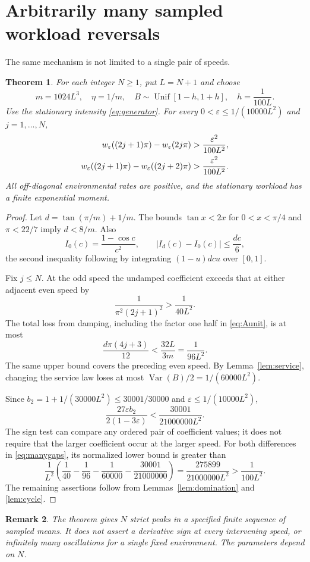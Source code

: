 \documentclass[10pt,a4paper]{amsart}
\numberwithin{equation}{section}
\newtheorem{theorem}{Theorem}[section]
\newtheorem{remark}[theorem]{Remark}
\newcommand{\1}{\mathbf 1}
\newcommand{\eps}{\varepsilon}
\DeclareMathOperator{\Var}{Var}
\DeclareMathOperator{\Unif}{Unif}
\begin{document}
\section{Arbitrarily many sampled workload reversals}\label{sec:many}
The same mechanism is not limited to a single pair of speeds.
\begin{theorem}\label{thm:many}
For each integer $N\ge1$, put $L=N+1$ and choose
\begin{equation}\label{eq:manyparameters}
 m=1024L^3,\quad \eta=1/m,\quad
 B\sim\Unif[1-h,1+h],\quad h=\frac1{100L}.
\end{equation}
Use the stationary intensity \eqref{eq:generator}. For every $0<\eps\le1/(10000L^2)$ and $j=1,\ldots,N$,
\begin{align}\label{eq:manygaps}
 w_\eps((2j+1)\pi)-w_\eps(2j\pi)&>\frac{\eps^2}{100L^2},\notag\\
 w_\eps((2j+1)\pi)-w_\eps((2j+2)\pi)&>\frac{\eps^2}{100L^2}.
\end{align}
All off-diagonal environmental rates are positive, and the stationary workload has a finite exponential moment.
\end{theorem}
\begin{proof}
Let $d=\tan(\pi/m)+1/m$. The bounds $\tan x<2x$ for $0<x<\pi/4$ and $\pi<22/7$ imply $d<8/m$. Also
\[
 I_0(c)=\frac{1-\cos c}{c^2},\qquad
 |I_d(c)-I_0(c)|\le\frac{dc}{6},
\]
the second inequality following by integrating $(1-u)dcu$ over $[0,1]$.

Fix $j\le N$. At the odd speed the undamped coefficient exceeds that at either adjacent even speed by
\[
 \frac{1}{\pi^2(2j+1)^2}>\frac1{40L^2}.
\]
The total loss from damping, including the factor one half in \eqref{eq:Aunit}, is at most
\[
 \frac{d\pi(4j+3)}{12}<\frac{32L}{3m}=\frac1{96L^2}.
\]
The same upper bound covers the preceding even speed. By Lemma~\ref{lem:service}, changing the service law loses at most $\Var(B)/2=1/(60000L^2)$.

Since $b_2=1+1/(30000L^2)\le30001/30000$ and $\eps\le1/(10000L^2)$,
\[
 \frac{27\eps b_2}{2(1-3\eps)}<\frac{30001}{21000000L^2}.
\]
The sign test can compare any ordered pair of coefficient values; it does not require that the larger coefficient occur at the larger speed. For both differences in \eqref{eq:manygaps}, its normalized lower bound is greater than
\[
 \frac1{L^2}\left(\frac1{40}-\frac1{96}-\frac1{60000}
                         -\frac{30001}{21000000}\right)
 =\frac{275899}{21000000L^2}>\frac1{100L^2}.
\]
The remaining assertions follow from Lemmas~\ref{lem:domination} and \ref{lem:cycle}.
\end{proof}
\begin{remark}
The theorem gives $N$ strict peaks in a specified finite sequence of sampled means. It does not assert a derivative sign at every intervening speed, or infinitely many oscillations for a single fixed environment. The parameters depend on $N$.
\end{remark}
\end{document}
